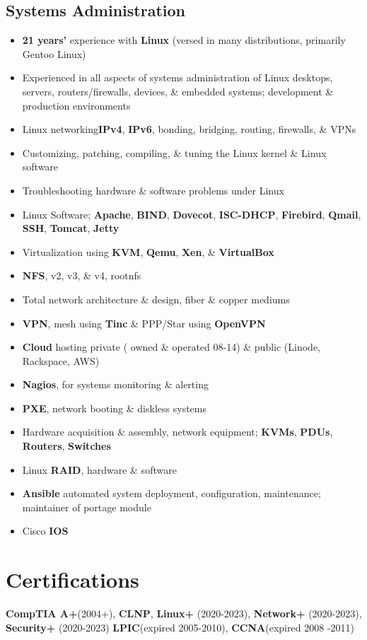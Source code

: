 \documentclass[10pt]{report}
\begin{document}
\subsection*{Systems Administration}
\begin{itemize}
  \item \textbf{21 years’} experience with \textbf{Linux} (versed in many distributions, primarily Gentoo Linux)
  \item Experienced in all aspects of systems administration of Linux desktops, servers, routers/firewalls, devices,
\& embedded systems; development \& production environments
  \item Linux networking\textbf{IPv4}, \textbf{IPv6}, bonding, bridging, routing, firewalls, \& VPNs
  \item Customizing, patching, compiling, \& tuning the Linux kernel \& Linux software
  \item Troubleshooting hardware \& software problems under Linux
  \item Linux Software; \textbf{Apache}, \textbf{BIND}, \textbf{Dovecot}, \textbf{ISC-DHCP}, \textbf{Firebird}, \textbf{Qmail}, \textbf{SSH}, \textbf{Tomcat}, \textbf{Jetty}
  \item Virtualization using \textbf{KVM}, \textbf{Qemu}, \textbf{Xen}, \& \textbf{VirtualBox}
  \item \textbf{NFS}, v2, v3, \& v4, rootnfs
  \item Total network architecture \& design, fiber \& copper mediums
  \item \textbf{VPN}, mesh using \textbf{Tinc} \& PPP/Star using \textbf{OpenVPN}
  \item \textbf{Cloud} hosting private ( owned \& operated 08-14) \& public (Linode, Rackspace, AWS)
  \item \textbf{Nagios}, for systems monitoring \& alerting
  \item \textbf{PXE}, network booting \& diskless systems
  \item Hardware acquisition \& assembly, network equipment; \textbf{KVMs}, \textbf{PDUs}, \textbf{Routers}, \textbf{Switches}
  \item Linux \textbf{RAID}, hardware \& software
  \item \textbf{Ansible} automated system deployment, configuration, maintenance; maintainer of portage module
  \item Cisco \textbf{IOS}
\end{itemize}

\section*{Certifications}
\textbf{CompTIA A+}(2004+), \textbf{CLNP}, \textbf{Linux+} (2020-2023), \textbf{Network+} (2020-2023), \textbf{Security+} (2020-2023) \textbf{LPIC}(expired 2005-2010), \textbf{CCNA}(expired 2008 -2011)
\end{document}
